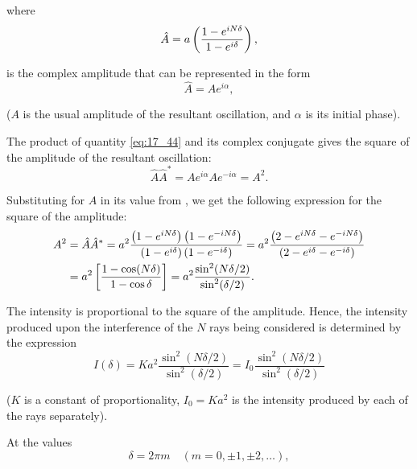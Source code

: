 \noindent
where
\begin{equation}\label{eq:17_43}
    \hat{A} = a \left(\frac{1 - e^{iN\delta}}{1 - e^{i\delta}}\right),
\end{equation}

\noindent
is the complex amplitude that can be represented in the form
\begin{equation}\label{eq:17_44}
    \hat{A} = A e^{i\alpha},
\end{equation}

\noindent
($A$ is the usual amplitude of the resultant oscillation, and $\alpha$ is its initial phase).

The product of quantity \eqref{eq:17_44} and its complex conjugate gives the square of the amplitude of the resultant oscillation:
\begin{equation}\label{eq:17_45}
    \hat{A}\hat{A}^* = A e^{i\alpha} A e^{-i\alpha} = A^2.
\end{equation}

\noindent
Substituting for $A$ in  its value from , we get the following expression for the square of the amplitude:
\begin{align}
    A^2 &= \hat{A}\hat{A}^* = a^2 \frac{ \left(1 - e^{iN\delta}\right) \left(1 - e^{-iN\delta}\right) }{ \left(1 - e^{i\delta}\right) \left(1 - e^{-i\delta}\right)} = a^2 \frac{ \left(2 - e^{iN\delta} - e^{-iN\delta}\right) }{ \left(2 - e^{i\delta} - e^{-i\delta}\right) } \nonumber\\
    & = a^2 \left[ \frac{1 - \cos(N\delta)}{1 - \cos\delta} \right] = a^2 \frac{\sin^2(N\delta/2)}{\sin^2(\delta/2)}. \label{eq:17_46}
\end{align}

The intensity is proportional to the square of the amplitude.
Hence, the intensity produced upon the interference of the $N$ rays being considered is determined by the expression
\begin{equation}\label{eq:17_47}
    I(\delta) = K a^2 \frac{\sin^2(N\delta/2)}{\sin^2(\delta/2)} = I_0 \frac{\sin^2(N\delta/2)}{\sin^2(\delta/2)}
\end{equation}

\noindent
($K$ is a constant of proportionality, $I_0=Ka^2$ is the intensity produced by each of the rays separately).

At the values
\begin{equation}\label{eq:17_48}
    \delta = 2 \pi m \quad (m = 0, \pm 1, \pm 2, \ldots),
\end{equation}

